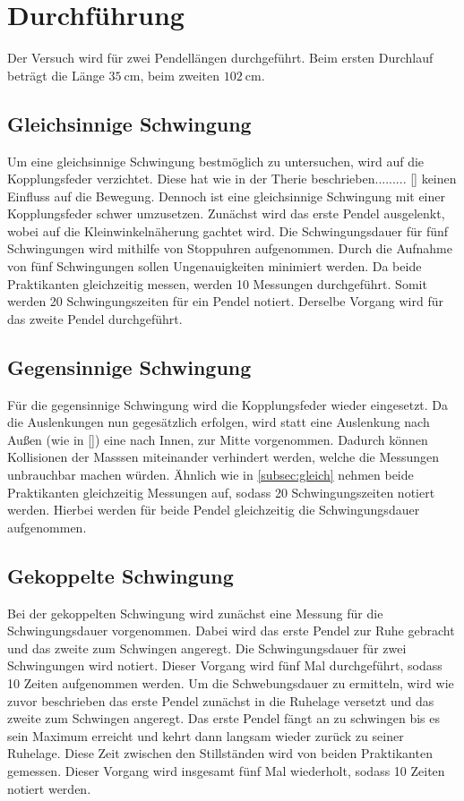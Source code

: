 \section{Durchführung}
\label{sec:Durchführung}
Der Versuch wird für zwei Pendellängen durchgeführt.
Beim ersten Durchlauf beträgt die Länge $\SI{35}{\centi\metre}$, beim zweiten $\SI{102}{\centi\metre}$.

\subsection{Gleichsinnige Schwingung}
\label{subsec:gleich}
Um eine gleichsinnige Schwingung bestmöglich zu untersuchen, wird auf die Kopplungsfeder verzichtet.
Diese hat wie in der Therie beschrieben......... \autoref{} keinen Einfluss auf die Bewegung.
Dennoch ist eine gleichsinnige Schwingung mit einer Kopplungsfeder schwer umzusetzen.
\noindent
Zunächst wird das erste Pendel ausgelenkt, wobei auf die Kleinwinkelnäherung gachtet wird.
Die Schwingungsdauer für fünf Schwingungen wird mithilfe von Stoppuhren aufgenommen.
Durch die Aufnahme von fünf Schwingungen sollen Ungenauigkeiten minimiert werden.
Da beide Praktikanten gleichzeitig messen, werden 10 Messungen durchgeführt.
Somit werden 20 Schwingungszeiten für ein Pendel notiert.
Derselbe Vorgang wird für das zweite Pendel durchgeführt.

\subsection{Gegensinnige Schwingung}
Für die gegensinnige Schwingung wird die Kopplungsfeder wieder eingesetzt.
Da die Auslenkungen nun gegesätzlich erfolgen, wird statt eine Auslenkung nach Außen (wie in \autoref{})
eine nach Innen, zur Mitte vorgenommen. Dadurch können Kollisionen der Masssen miteinander verhindert werden,
welche die Messungen unbrauchbar machen würden.
Ähnlich wie in \autoref{subsec:gleich} nehmen beide Praktikanten gleichzeitig Messungen auf, sodass 20 Schwingungszeiten notiert werden.
Hierbei werden für beide Pendel gleichzeitig die Schwingungsdauer aufgenommen.

\subsection{Gekoppelte Schwingung}
Bei der gekoppelten Schwingung wird zunächst eine Messung für die Schwingungsdauer vorgenommen.
Dabei wird das erste Pendel zur Ruhe gebracht und das zweite zum Schwingen angeregt.
Die Schwingungsdauer für zwei Schwingungen wird notiert.
Dieser Vorgang wird fünf Mal durchgeführt, sodass 10 Zeiten aufgenommen werden.
\noindent
Um die Schwebungsdauer zu ermitteln, wird wie zuvor beschrieben das erste Pendel zunächst in die Ruhelage versetzt und das zweite zum Schwingen
angeregt.
Das erste Pendel fängt an zu schwingen bis es sein Maximum erreicht und kehrt dann langsam wieder zurück zu seiner Ruhelage.
Diese Zeit zwischen den Stillständen wird von beiden Praktikanten gemessen.
Dieser Vorgang wird insgesamt fünf Mal wiederholt, sodass 10 Zeiten notiert werden.